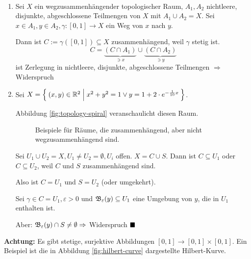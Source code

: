 \begin{beweis}~\\
    \begin{enumerate}[label=(\roman*)]
    \item Sei $X$ ein wegzusammenhängender topologischer Raum, $A_1, A_2$
    nichtleere, disjunkte, abgeschlossene Teilmengen von $X$ mit
    $A_1 \cup A_2 = X$. Sei $x \in A_1, y \in A_2, \gamma:[0,1] \rightarrow X$
    ein Weg von $x$ nach $y$.

    Dann ist $C:= \gamma([0,1]) \subseteq X$ zusammenhängend, weil 
    $\gamma$ stetig ist.
    \[C = \underbrace{(C \cap A_1)}_{\ni x} \cup \underbrace{(C \cap A_2)}_{\ni y}\]
    ist Zerlegung in nichtleere, disjunkte, abgeschlossene Teilmengen
    $\Rightarrow$ Widerspruch 

    \item Sei $X = \Set{(x,y) \in \ensuremath{\mathbb{R}}^2| x^2 + y^2 = 1 \lor y = 1 +2\cdot e^{-\frac{1}{10} x}}$.

        Abbildung \ref{fig:topology-spiral} veranschaulicht diesen Raum.

        \begin{figure}[htp]
            \centering
            \subfloat[Sinus]{
                
                \label{fig:sinx}
            }%

            \caption{Beispiele für Räume, die zusammenhängend, aber nicht wegzusammenhängend sind.}
            \label{fig:zusammenhang-beispiele}
        \end{figure}

          Sei $U_1 \cup U_2 = X, U_1 \neq U_2 = \emptyset, U_i$ offen.
          $X = C \cup S$. Dann ist $C \subseteq U_1$ oder $C \subseteq U_2$,
          weil $C$ und $S$ zusammenhängend sind.

          Also ist $C = U_1$ und $S = U_2$ (oder umgekehrt).

          Sei $\gamma \in C = U_1, \varepsilon > 0$ und $\mathfrak{B}_\varepsilon (y) \subseteq U_1$
          eine Umgebung von $y$, die in $U_1$ enthalten ist.

          Aber: $\mathfrak{B}_\varepsilon(y) \cap S \neq \emptyset \Rightarrow$
          Widerspruch 
$\qed$
    \end{enumerate}
\end{beweis}

\textbf{Achtung:} Es gibt stetige, surjektive Abbildungen 
    $[0,1] \rightarrow [0,1] \times [0,1]$. Ein Beispiel ist die
    in Abbildung \ref{fig:hilbert-curve} dargestellte Hilbert-Kurve.
    
